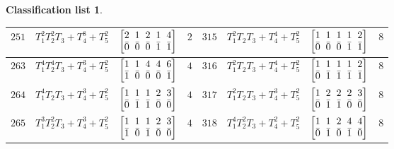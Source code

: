 \documentclass[10pt,a4paper]{amsart}
\theoremstyle{definition}
\newtheorem{class-list}[thm]{Classification list}
\numberwithin{equation}{section}
\begin{document}
\begin{class-list}
\begin{table}[h!]
\begin{tabu}{c|c|c|c||c|c|c|c}
\\
\hline
${251}$&${T_{1}^{2}T_{2}^{2}T_{3}+T_{4}^{8}+T_{5}^{2}}$
&$\arraycolsep=1mm\begin{bmatrix}{2} & {1} & {2} & {1} & {4} \\ {\bar{0}} & {\bar{0}} & {\bar{0}} & {\bar{1}} & {\bar{1}}\end{bmatrix}$&${2}$
&${315}$&${T_{1}^{2}T_{2}T_{3}+T_{4}^{4}+T_{5}^{2}}$
&$\arraycolsep=1mm\begin{bmatrix}{1} & {1} & {1} & {1} & {2} \\ {\bar{0}} & {\bar{0}} & {\bar{0}} & {\bar{1}} & {\bar{1}}\end{bmatrix}$&${8}$
\\
\hline
${263}$&${T_{1}^{4}T_{2}^{4}T_{3}+T_{4}^{3}+T_{5}^{2}}$
&$\arraycolsep=1mm\begin{bmatrix}{1} & {1} & {4} & {4} & {6} \\ {\bar{1}} & {\bar{0}} & {\bar{0}} & {\bar{0}} & {\bar{1}}\end{bmatrix}$&${4}$
&${316}$&${T_{1}^{2}T_{2}T_{3}+T_{4}^{4}+T_{5}^{2}}$
&$\arraycolsep=1mm\begin{bmatrix}{1} & {1} & {1} & {1} & {2} \\ {\bar{0}} & {\bar{1}} & {\bar{1}} & {\bar{1}} & {\bar{1}}\end{bmatrix}$&${8}$
\\
\hline
${264}$&${T_{1}^{4}T_{2}T_{3}+T_{4}^{3}+T_{5}^{2}}$
&$\arraycolsep=1mm\begin{bmatrix}{1} & {1} & {1} & {2} & {3} \\ {\bar{0}} & {\bar{1}} & {\bar{1}} & {\bar{0}} & {\bar{0}}\end{bmatrix}$&${4}$
&${317}$&${T_{1}^{2}T_{2}T_{3}+T_{4}^{3}+T_{5}^{2}}$
&$\arraycolsep=1mm\begin{bmatrix}{1} & {2} & {2} & {2} & {3} \\ {\bar{0}} & {\bar{1}} & {\bar{1}} & {\bar{0}} & {\bar{0}}\end{bmatrix}$&${8}$
\\
\hline
${265}$&${T_{1}^{3}T_{2}^{2}T_{3}+T_{4}^{3}+T_{5}^{2}}$
&$\arraycolsep=1mm\begin{bmatrix}{1} & {1} & {1} & {2} & {3} \\ {\bar{1}} & {\bar{0}} & {\bar{1}} & {\bar{0}} & {\bar{0}}\end{bmatrix}$&${4}$
&${318}$&${T_{1}^{4}T_{2}^{2}T_{3}+T_{4}^{2}+T_{5}^{2}}$
&$\arraycolsep=1mm\begin{bmatrix}{1} & {1} & {2} & {4} & {4} \\ {\bar{0}} & {\bar{1}} & {\bar{0}} & {\bar{1}} & {\bar{0}}\end{bmatrix}$&${8}$

\end{tabu}
\end{table}
\end{class-list}
\end{document}
